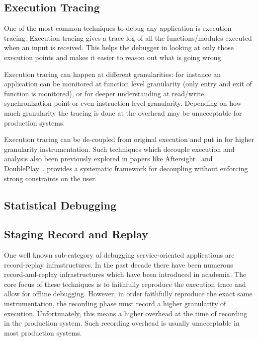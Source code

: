 \subsection{Execution Tracing}

One of the most common techniques to debug any application is execution tracing. 
Execution tracing gives a trace log of all the functions/modules executed when an input is received. 
This helps the debugger in looking at only those execution points and makes it easier to reason out what is going wrong.

Execution tracing can happen at different granularities: for instance an application can be monitored at function level granularity (only entry and exit of function is monitored), or for deeper understanding at read/write, synchronization point or even instruction level granularity.
Depending on how much granularity the tracing is done at the overhead may be unacceptable for production systems.

Execution tracing can be de-coupled from original execution and put in \debugcontainer for higher granularity instrumentation. 
Such techniques which decouple execution and analysis also been previously explored in papers like Aftersight~\cite{aftersight} and DoublePlay~\cite{doubleplay}.
\parikshan provides a systematic framework for decoupling without enforcing strong constraints on the user.

\subsection{Statistical Debugging}



\subsection{Staging Record and Replay}

One well known sub-category of debugging service-oriented applications are record-replay infrastructures.
In the past decade there have been numerous record-and-replay infrastructures which have been introduced in academia.
The core focus of these techniques is to faithfully reproduce the execution trace and allow for offline debugging.
However, in order faithfully reproduce the exact same instrumentation, the recording phase must record a higher granularity of execution.
Unfortunately, this means a higher overhead at the time of recording in the production system.
Such recording overhead is usually unacceptable in most production systems.

